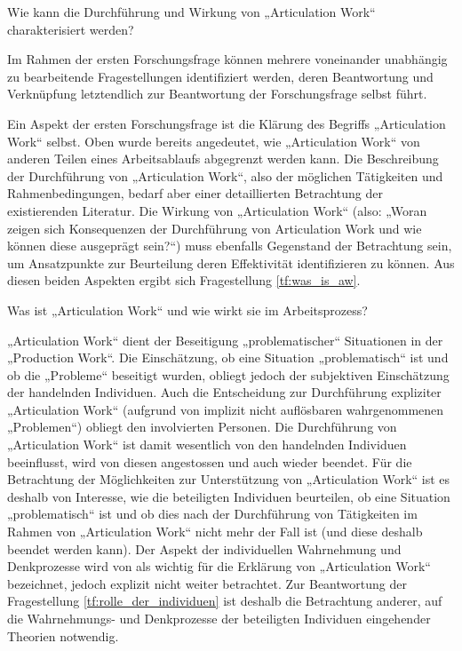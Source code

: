 \begin{ff}
	\label{ff:beschreibung}
	Wie kann die Durchführung und Wirkung von „Articulation Work“ charakterisiert werden?
\end{ff}

Im Rahmen der ersten Forschungsfrage können mehrere voneinander unabhängig zu bearbeitende Fragestellungen identifiziert werden, deren Beantwortung und Verknüpfung letztendlich zur Beantwortung der Forschungsfrage selbst führt.

Ein Aspekt der ersten Forschungsfrage ist die Klärung des Begriffs „Articulation Work“ selbst. Oben wurde bereits angedeutet, wie „Articulation Work“ von anderen Teilen eines Arbeitsablaufs abgegrenzt werden kann. Die Beschreibung der Durchführung von „Articulation Work“, also der möglichen Tätigkeiten und Rahmenbedingungen, bedarf aber einer detaillierten Betrachtung der existierenden Literatur. Die Wirkung von „Articulation Work“ (also: „Woran zeigen sich Konsequenzen der Durchführung von Articulation Work und wie können diese ausgeprägt sein?“) muss ebenfalls Gegenstand der Betrachtung sein, um Ansatzpunkte zur Beurteilung deren Effektivität identifizieren zu können. Aus diesen beiden Aspekten ergibt sich Fragestellung \ref{tf:was_is_aw}.

\begin{tf}
	\label{tf:was_is_aw}
	Was ist „Articulation Work“ und wie wirkt sie im Arbeitsprozess?
\end{tf}

„Articulation Work“ dient der Beseitigung „problematischer“ Situationen in der „Production Work“. Die Einschätzung, ob eine Situation „problematisch“ ist und ob die „Probleme“ beseitigt wurden, obliegt jedoch der subjektiven Einschätzung der handelnden Individuen. Auch die Entscheidung zur Durchführung expliziter „Articulation Work“ (aufgrund von implizit nicht auflösbaren wahrgenommenen „Problemen“) obliegt den involvierten Personen. Die Durchführung von „Articulation Work“ ist damit wesentlich von den handelnden Individuen beeinflusst, wird von diesen angestossen und auch wieder beendet. Für die Betrachtung der Möglichkeiten zur Unterstützung von „Articulation Work“ ist es deshalb von Interesse, wie die beteiligten Individuen beurteilen, ob eine Situation „problematisch“ ist und ob dies nach der Durchführung von Tätigkeiten im Rahmen von „Articulation Work“ nicht mehr der Fall ist (und diese deshalb beendet werden kann). Der Aspekt der individuellen Wahrnehmung und Denkprozesse wird von \citet[][S. 131]{Strauss93} als wichtig für die Erklärung von „Articulation Work“ bezeichnet, jedoch explizit nicht weiter betrachtet. Zur Beantwortung der Fragestellung \ref{tf:rolle_der_individuen} ist deshalb die Betrachtung anderer, auf die Wahrnehmungs- und Denkprozesse der beteiligten Individuen eingehender Theorien notwendig.

